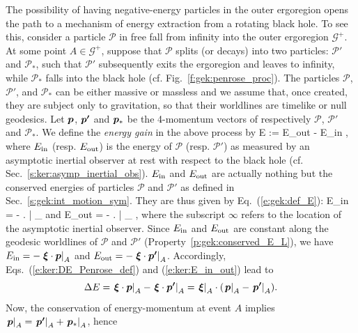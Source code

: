 The possibility of having negative-energy particles in the outer ergoregion opens the path
to a mechanism of energy extraction from a rotating black hole.
To see this, consider a particle $\mathscr{P}$
in free fall from infinity into the outer ergoregion $\mathscr{G}^+$. At some point $A\in \mathscr{G}^+$, suppose that $\mathscr{P}$
splits (or decays) into two particles: $\mathscr{P}'$
and $\mathscr{P}_*$, such that $\mathscr{P}'$
subsequently exits the ergoregion and leaves to infinity,
while $\mathscr{P}_*$ falls into the black hole (cf. Fig.~\ref{f:gek:penrose_proc}).
The particles $\mathscr{P}$, $\mathscr{P}'$,
and $\mathscr{P}_*$ can be either massive or massless and we
assume that, once created, they are subject only to gravitation, so that their worldlines are
timelike or null geodesics. Let $\bm{p}$,  $\bm{p'}$ and $\bm{p}_*$
be the 4-momentum vectors of respectively $\mathscr{P}$, $\mathscr{P}'$ and $\mathscr{P}_*$.
We define the \emph{energy gain} in the above process by
\be \label{e:ker:DE_Penrose_def}
    \Delta E := E_{\rm out} - E_{\rm in} ,
\ee
where $E_{\rm in}$ (resp. $E_{\rm out}$) is the energy of $\mathscr{P}$
(resp. $\mathscr{P}'$) as measured by an asymptotic inertial observer
at rest with respect to the black hole (cf. Sec.~\ref{s:ker:asymp_inertial_obs}).
$E_{\rm in}$ and $E_{\rm out}$ are actually nothing but the conserved
energies of particles $\mathscr{P}$ and $\mathscr{P}'$ as defined in
Sec.~\ref{s:gek:int_motion_sym}. They are thus given by Eq.~(\ref{e:gek:def_E}):
\be \label{e:ker:E_in_out}
    E_{\rm in} = - \left.  \w{\xi} \cdot {} \right| _{\infty}
    \qquad \mbox{and}\qquad
    E_{\rm out} = - \left.  \w{\xi} \cdot {} \right| _{\infty}  ,
\ee
where the subscript $\infty$ refers to the location of the asymptotic inertial observer.
Since $E_{\rm in}$ and $E_{\rm out}$ are constant along the geodesic worldlines
of $\mathscr{P}$ and $\mathscr{P}'$ (Property~\ref{p:gek:conserved_E_L}), we have
$E_{\rm in} = - \left. \bm{\xi} \cdot \bm{p} \right| _{A}$
and $E_{\rm out} = - \left. \bm{\xi} \cdot \bm{p'} \right| _{A}$. Accordingly, Eqs.~(\ref{e:ker:DE_Penrose_def}) and
(\ref{e:ker:E_in_out}) lead to
\[
    \Delta E = \left. \bm{\xi} \cdot \bm{p} \right| _{A} - \left. \bm{\xi} \cdot \bm{p'} \right| _{A} =
    \left.  \bm{\xi} \right| _{A} \cdot (\left. \bm{p} \right| _{A}
        - \left. \bm{p'} \right| _{A}) .
\]
Now, the conservation of energy-momentum at event $A$
implies $\left. \bm{p} \right| _{A} = \left. \bm{p'} \right| _{A} + \left. \bm{p}_* \right| _{A}$, hence
